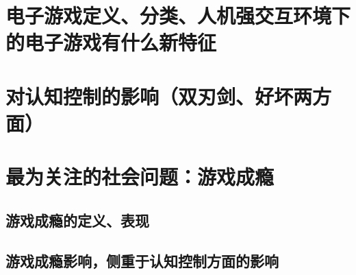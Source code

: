 \section{电子游戏定义、分类、人机强交互环境下的电子游戏有什么新特征}
\section{对认知控制的影响（双刃剑、好坏两方面）}
\section{最为关注的社会问题：游戏成瘾}
\subsection{游戏成瘾的定义、表现}
\subsection{游戏成瘾影响，侧重于认知控制方面的影响}